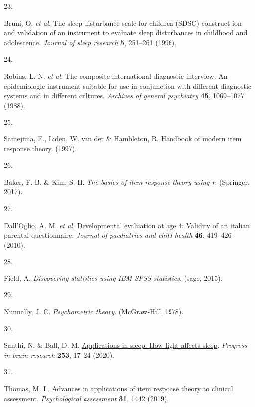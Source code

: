 \documentclass[
  man]{apa6}
\newlength{\cslhangindent}
\newlength{\csllabelwidth}
\newlength{\cslentryspacingunit} %
\newenvironment{CSLReferences}[2] %
 {%
  \setlength{\parindent}{0pt}
  \ifodd #1
  \let\oldpar\par
  \def\par{\hangindent=\cslhangindent\oldpar}
  \fi
  \setlength{\parskip}{#2\cslentryspacingunit}
 }%
 {}
\newcommand{\CSLLeftMargin}[1]{\parbox[t]{\csllabelwidth}{#1}}
\newcommand{\CSLRightInline}[1]{\parbox[t]{\linewidth - \csllabelwidth}{#1}\break}
\begin{document}
\begin{CSLReferences}{0}{0}
\leavevmode{}%
\CSLLeftMargin{23. }%
\CSLRightInline{Bruni, O. \emph{et al.} The sleep disturbance scale for children (SDSC) construct ion and validation of an instrument to evaluate sleep disturbances in childhood and adolescence. \emph{Journal of sleep research} \textbf{5}, 251--261 (1996).}

\leavevmode{}%
\CSLLeftMargin{24. }%
\CSLRightInline{Robins, L. N. \emph{et al.} The composite international diagnostic interview: An epidemiologic instrument suitable for use in conjunction with different diagnostic systems and in different cultures. \emph{Archives of general psychiatry} \textbf{45}, 1069--1077 (1988).}

\leavevmode{}%
\CSLLeftMargin{25. }%
\CSLRightInline{Samejima, F., Liden, W. van der \& Hambleton, R. Handbook of modern item response theory. (1997).}

\leavevmode{}%
\CSLLeftMargin{26. }%
\CSLRightInline{Baker, F. B. \& Kim, S.-H. \emph{The basics of item response theory using r}. (Springer, 2017).}

\leavevmode{}%
\CSLLeftMargin{27. }%
\CSLRightInline{Dall'Oglio, A. M. \emph{et al.} Developmental evaluation at age 4: Validity of an italian parental questionnaire. \emph{Journal of paediatrics and child health} \textbf{46}, 419--426 (2010).}

\leavevmode{}%
\CSLLeftMargin{28. }%
\CSLRightInline{Field, A. \emph{Discovering statistics using IBM SPSS statistics}. (sage, 2015).}

\leavevmode{}%
\CSLLeftMargin{29. }%
\CSLRightInline{Nunnally, J. C. \emph{Psychometric theory}. ({McGraw-Hill}, 1978).}

\leavevmode{}%
\CSLLeftMargin{30. }%
\CSLRightInline{Santhi, N. \& Ball, D. M. \href{https://doi.org/10.1016/bs.pbr.2020.05.029}{Applications in sleep: {How} light affects sleep}. \emph{Progress in brain research} \textbf{253}, 17--24 (2020).}

\leavevmode{}%
\CSLLeftMargin{31. }%
\CSLRightInline{Thomas, M. L. Advances in applications of item response theory to clinical assessment. \emph{Psychological assessment} \textbf{31}, 1442 (2019).}


\end{CSLReferences}
\end{document}
